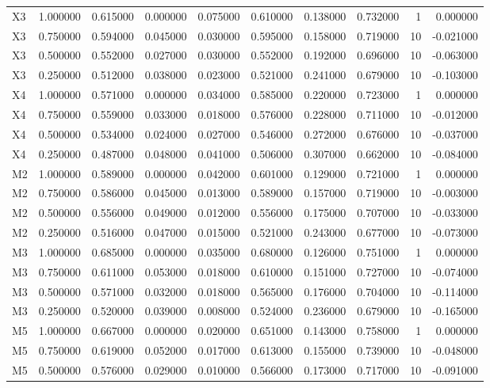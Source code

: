 \begin{table}
\begin{tabular}{lrrrrrrrrr}
X3 & 1.000000 & 0.615000 & 0.000000 & 0.075000 & 0.610000 & 0.138000 & 0.732000 & 1 & 0.000000 \\
X3 & 0.750000 & 0.594000 & 0.045000 & 0.030000 & 0.595000 & 0.158000 & 0.719000 & 10 & -0.021000 \\
X3 & 0.500000 & 0.552000 & 0.027000 & 0.030000 & 0.552000 & 0.192000 & 0.696000 & 10 & -0.063000 \\
X3 & 0.250000 & 0.512000 & 0.038000 & 0.023000 & 0.521000 & 0.241000 & 0.679000 & 10 & -0.103000 \\
X4 & 1.000000 & 0.571000 & 0.000000 & 0.034000 & 0.585000 & 0.220000 & 0.723000 & 1 & 0.000000 \\
X4 & 0.750000 & 0.559000 & 0.033000 & 0.018000 & 0.576000 & 0.228000 & 0.711000 & 10 & -0.012000 \\
X4 & 0.500000 & 0.534000 & 0.024000 & 0.027000 & 0.546000 & 0.272000 & 0.676000 & 10 & -0.037000 \\
X4 & 0.250000 & 0.487000 & 0.048000 & 0.041000 & 0.506000 & 0.307000 & 0.662000 & 10 & -0.084000 \\
M2 & 1.000000 & 0.589000 & 0.000000 & 0.042000 & 0.601000 & 0.129000 & 0.721000 & 1 & 0.000000 \\
M2 & 0.750000 & 0.586000 & 0.045000 & 0.013000 & 0.589000 & 0.157000 & 0.719000 & 10 & -0.003000 \\
M2 & 0.500000 & 0.556000 & 0.049000 & 0.012000 & 0.556000 & 0.175000 & 0.707000 & 10 & -0.033000 \\
M2 & 0.250000 & 0.516000 & 0.047000 & 0.015000 & 0.521000 & 0.243000 & 0.677000 & 10 & -0.073000 \\
M3 & 1.000000 & 0.685000 & 0.000000 & 0.035000 & 0.680000 & 0.126000 & 0.751000 & 1 & 0.000000 \\
M3 & 0.750000 & 0.611000 & 0.053000 & 0.018000 & 0.610000 & 0.151000 & 0.727000 & 10 & -0.074000 \\
M3 & 0.500000 & 0.571000 & 0.032000 & 0.018000 & 0.565000 & 0.176000 & 0.704000 & 10 & -0.114000 \\
M3 & 0.250000 & 0.520000 & 0.039000 & 0.008000 & 0.524000 & 0.236000 & 0.679000 & 10 & -0.165000 \\
M5 & 1.000000 & 0.667000 & 0.000000 & 0.020000 & 0.651000 & 0.143000 & 0.758000 & 1 & 0.000000 \\
M5 & 0.750000 & 0.619000 & 0.052000 & 0.017000 & 0.613000 & 0.155000 & 0.739000 & 10 & -0.048000 \\
M5 & 0.500000 & 0.576000 & 0.029000 & 0.010000 & 0.566000 & 0.173000 & 0.717000 & 10 & -0.091000 \\

\end{tabular}
\end{table}
